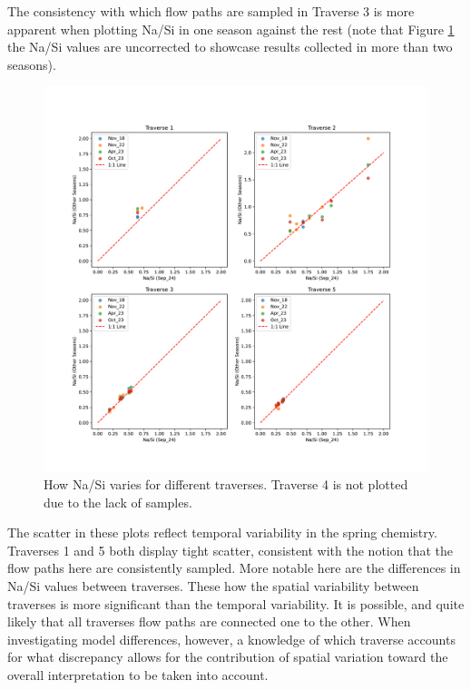 \bsk

The consistency with which flow paths are sampled in Traverse 3 is more apparent when plotting Na/Si in one season against the rest (note that Figure \ref{fig:spatial_changes_spring8} the Na/Si values are uncorrected to showcase results collected in more than two seasons). 

\begin{figure}[h]
    \centering
    \includegraphics[width=\textwidth]{Na_Si_Seasons.pdf}
    \caption{How Na/Si varies for different traverses. Traverse 4 is not plotted due to the lack of samples.}
    \label{fig:spatial_changes_spring8}
\end{figure}
\FloatBarrier

The scatter in these plots reflect temporal variability in the spring chemistry. Traverses 1 and 5 both display tight scatter, consistent with the notion that the flow paths here are consistently sampled. More notable here are the differences in Na/Si values between traverses. These how the spatial variability between traverses is more significant than the temporal variability. It is possible, and quite likely that all traverses flow paths are connected one to the other. When investigating model differences, however, a knowledge of which traverse accounts for what discrepancy allows for the contribution of spatial variation toward the overall interpretation to be taken into account.

